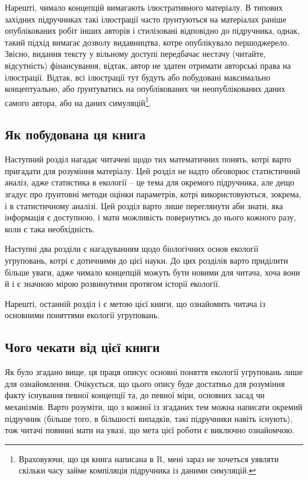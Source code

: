 \documentclass[
  11pt,
]{book}
\begin{document}
Нарешті, чимало концепцій вимагають ілюстративного матеріалу. В типових західних підручниках такі ілюстрації часто ґрунтуються на матеріалах раніше опублікованих робіт інших авторів і стилізовані відповідно до підручника, однак, такий підхід вимагає дозволу видавництва, котре опублікувало першоджерело. Звісно, видання тексту у вільному доступі передбачає нестачу (читайте, відсутність) фінансування, відтак, автор не здатен отримати авторські права на ілюстрації. Відтак, всі ілюстрації тут будуть або побудовані максимально концептуально, або ґрунтуватись на опублікованих чи неопублікованих даних самого автора, або на даних симуляцій\footnote{Враховуючи, що ця книга написана в R, мені зараз не хочеться уявляти скільки часу займе компіляція підручника із даними симуляцій.}.

\subsection{Як побудована ця книга}\label{how-built}

Наступний розділ нагадає читачеві щодо тих математичних понять, котрі варто пригадати для розуміння матеріалу. Цей розділ не надто обговорює статистичний аналіз, адже статистика в екології -- це тема для окремого підручника, але дещо згадує про ґрунтовні методи оцінки параметрів, котрі використовуються, зокрема, і в статистичному аналізі. Цей розділ варто лише переглянути аби знати, яка інформація є доступною, і мати можливість повернутись до нього кожного разу, коли є така необхідність.

Наступні два розділи є нагадуванням щодо біологічних основ екології угруповань, котрі є дотичними до цієї науки. До цих розділів варто приділити більше уваги, адже чимало концепцій можуть бути новими для читача, хоча вони й і є значною мірою розвинутими протягом історії екології.

Нарешті, останній розділ і є метою цієї книги, що ознайомить читача із основними поняттями екології угруповань.

\subsection{Чого чекати від цієї книги}\label{expect}

Як було згадано вище, ця праця описує основні поняття екології угруповань лише для ознайомлення. Очікується, що цього опису буде достатньо для розуміння факту існування певної концепції та, до певної міри, основних засад чи механізмів. Варто розуміти, що з кожної із згаданих тем можна написати окремий підручник (більше того, в більшості випадків, такі підручники навіть існують), тож читачі повинні мати на увазі, що мета цієї роботи є виключно ознайомчою.
\end{document}
